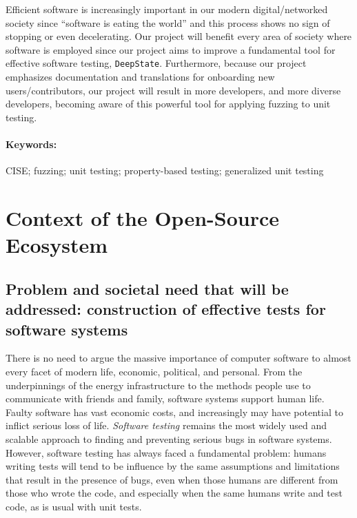 \documentclass[numbers]{proposalnsf}
\newcommand{\ds}{\texttt{DeepState}}
\begin{document}
Efficient software is increasingly important in our modern digital/networked society since ``software is eating the world'' and this process shows no sign of stopping or even decelerating. 
Our project will benefit every area of society where software is employed since our project aims to improve a fundamental tool for effective software testing, \ds.
Furthermore, because our project emphasizes documentation and translations for onboarding new users/contributors, our project will result in more developers, and more diverse developers, becoming aware of this powerful tool for applying fuzzing to unit testing.

\paragraph{Keywords:}
CISE; fuzzing; unit testing; property-based testing; generalized unit testing

\newpage  
\section{Context of the Open-Source Ecosystem}%


\vspace{-2mm}\subsection{Problem and societal need that will be addressed: construction of effective tests for software systems}

There is no need to argue the massive importance of computer software to almost every facet of modern life, economic, political, and personal.  From the underpinnings of the energy infrastructure to the methods people use to communicate with friends and family, software systems support human life.  Faulty software has vast economic costs, and increasingly may have potential to inflict serious loss of life.  \emph{Software testing} remains the most widely used and scalable approach to finding and preventing serious bugs in software systems.  However, software testing has always faced a fundamental problem: humans writing tests will tend to be influence by the same assumptions and limitations that result in the presence of bugs, even when those humans are different from those who wrote the code, and especially when the same humans write and test code, as is usual with unit tests.
\end{document}
